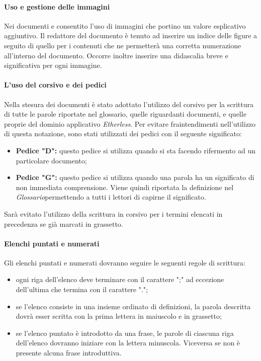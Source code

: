   \paragraph{Uso e gestione delle immagini}
  Nei documenti e consentito l'uso di immagini che portino un valore esplicativo
  aggiuntivo. Il redattore del documento è tenuto ad inserire un indice delle figure a seguito di quello per i contenuti che ne permetterà una corretta numerazione all'interno del documento. Occorre inoltre inserire una didascalia breve e significativa per ogni immagine.

  \paragraph{L'uso del corsivo e dei pedici}
  Nella stesura dei documenti è stato adottato l'utilizzo del corsivo per la scrittura di tutte le parole riportate nel glossario, quelle riguardanti documenti, e quelle proprie del dominio applicativo \textit{Etherless}.
  Per evitare fraintendimenti nell'utilizzo di questa notazione, sono stati utilizzati dei pedici con il seguente significato:
    \begin{itemize}
      \item \textbf{Pedice "D":} questo pedice si utilizza quando si sta facendo rifermento
      ad un particolare documento;
      \item \textbf{Pedice "G":} questo pedice si utilizza quando una parola ha un significato
      di non immediata comprensione. Viene quindi riportata la definizione nel
      \textit{Glossario}\doc permettendo a tutti i lettori di capirne il significato.
    \end{itemize}
  Sarà evitato l'utilizzo della scrittura in corsivo per i termini elencati in precedenza se già marcati in grassetto.

  \paragraph{Elenchi puntati e numerati}
  Gli elenchi puntati e numerati dovranno seguire le seguenti regole di scrittura:
	\begin{itemize}
		\item ogni riga dell'elenco deve terminare con il carattere ";" ad eccezione dell'ultima che termina con il carattere ".";
		\item se l'elenco consiste in una insieme ordinato di definizioni, la parola descritta dovrà esser scritta con la prima lettera in maiuscolo e in grassetto;
		\item se l'elenco puntato è introdotto da una frase, le parole di ciascuna riga dell'elenco dovranno iniziare con la lettera minuscola. Viceversa se non è presente alcuna frase introduttiva. 
	\end{itemize}

